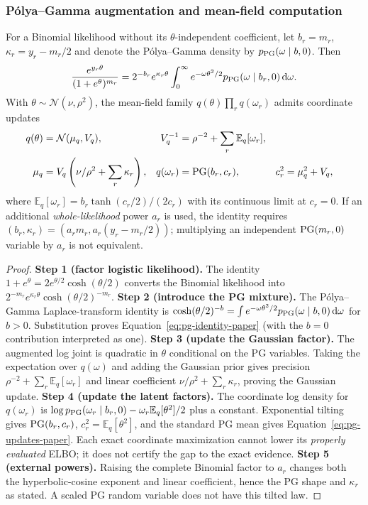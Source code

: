 \subsubsection{P\'olya--Gamma augmentation and mean-field computation}
\begin{proposition}
\label{prop:pg-paper}
For a Binomial likelihood without its $\theta$-independent coefficient, let $b_r=m_r$, $\kappa_r=y_r-m_r/2$ and denote the P\'olya--Gamma density by $p_{\rm PG}(\omega\mid b,0)$. Then
\begin{equation}
\frac{e^{y_r\theta}}{(1+e^\theta)^{m_r}}
=2^{-b_r}e^{\kappa_r\theta}
\int_0^\infty e^{-\omega\theta^2/2}p_{\rm PG}(\omega\mid b_r,0)\,\mathrm{d}\omega.
\label{eq:pg-identity-paper}
\end{equation}
With $\theta\sim\mathcal N(\nu,\rho^2)$, the mean-field family $q(\theta)\prod_rq(\omega_r)$ admits coordinate updates
\begin{align}
q(\theta)&=\mathcal N(\mu_q,V_q),
& V_q^{-1}&=\rho^{-2}+\sum_r\mathbb E_q[\omega_r],\nonumber\\
\mu_q&=V_q\left(\nu/\rho^2+\sum_r\kappa_r\right),
& q(\omega_r)&={\rm PG}(b_r,c_r),
& c_r^2&=\mu_q^2+V_q,
\label{eq:pg-updates-paper}
\end{align}
where $\mathbb E_q[\omega_r]=b_r\tanh(c_r/2)/(2c_r)$ with its continuous limit at $c_r=0$. If an additional \emph{whole-likelihood} power $a_r$ is used, the identity requires $(b_r,\kappa_r)=(a_rm_r,a_r(y_r-m_r/2))$; multiplying an independent ${\rm PG}(m_r,0)$ variable by $a_r$ is not equivalent.
\end{proposition}
\begin{proof}
\textbf{Step 1 (factor logistic likelihood).} The identity $1+e^\theta=2e^{\theta/2}\cosh(\theta/2)$ converts the Binomial likelihood into $2^{-m_r}e^{\kappa_r\theta}\cosh(\theta/2)^{-m_r}$.
\textbf{Step 2 (introduce the PG mixture).} The P\'olya--Gamma Laplace-transform identity is $\cosh(\theta/2)^{-b}=\int e^{-\omega\theta^2/2}p_{\rm PG}(\omega\mid b,0)\,\mathrm{d}\omega$ for $b>0$. Substitution proves Equation~\eqref{eq:pg-identity-paper} (with the $b=0$ contribution interpreted as one).
\textbf{Step 3 (update the Gaussian factor).} The augmented log joint is quadratic in $\theta$ conditional on the PG variables. Taking the expectation over $q(\omega)$ and adding the Gaussian prior gives precision $\rho^{-2}+\sum_r\mathbb E_q[\omega_r]$ and linear coefficient $\nu/\rho^2+\sum_r\kappa_r$, proving the Gaussian update.
\textbf{Step 4 (update the latent factors).} The coordinate log density for $q(\omega_r)$ is $\log p_{\rm PG}(\omega_r\mid b_r,0)-\omega_r\mathbb E_q[\theta^2]/2$ plus a constant. Exponential tilting gives ${\rm PG}(b_r,c_r)$, $c_r^2=\mathbb E_q[\theta^2]$, and the standard PG mean gives Equation~\eqref{eq:pg-updates-paper}. Each exact coordinate maximization cannot lower its \emph{properly evaluated} ELBO; it does not certify the gap to the exact evidence.
\textbf{Step 5 (external powers).} Raising the complete Binomial factor to $a_r$ changes both the hyperbolic-cosine exponent and linear coefficient, hence the PG shape and $\kappa_r$ as stated. A scaled PG random variable does not have this tilted law.
\end{proof}

